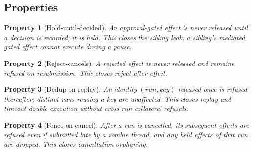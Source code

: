 \documentclass[10pt,journal,compsoc]{IEEEtran}
\newtheorem{property}{Property}
\begin{document}
\subsection{Properties}
\begin{property}[Hold-until-decided]
An approval-gated effect is never released until a decision is recorded; it is
held. This closes the sibling leak: a sibling's mediated gated effect cannot
execute during a pause.
\end{property}
\begin{property}[Reject-cancels]
A rejected effect is never released and remains refused on resubmission. This
closes reject-after-effect.
\end{property}
\begin{property}[Dedup-on-replay]
An identity $(\mathit{run},\mathit{key})$ released once is refused thereafter;
distinct runs reusing a key are unaffected. This closes replay and timeout
double-execution without cross-run collateral refusals.
\end{property}
\begin{property}[Fence-on-cancel]
After a run is cancelled, its subsequent effects are refused even if submitted
late by a zombie thread, and any held effects of that run are dropped. This
closes cancellation orphaning.
\end{property}
\end{document}
